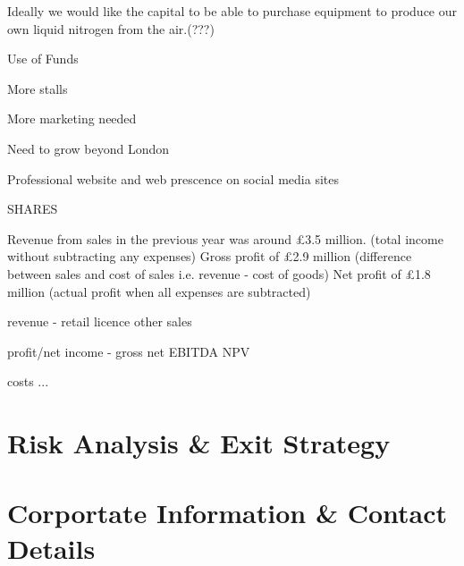 \documentclass{article}
\begin{document}
Ideally we would like the capital to be able to purchase equipment to
produce our own liquid nitrogen from the air.(???)

Use of Funds

More stalls

More marketing needed

Need to grow beyond London

Professional website and web prescence on social media sites


SHARES

Revenue from sales in the previous year was around £3.5 million. (total income without subtracting any expenses) 
Gross profit of £2.9 million (difference between sales and cost of sales i.e. revenue - cost of goods)
Net profit of £1.8 million (actual profit when all expenses are subtracted)



revenue
 - retail
   licence
   other sales

profit/net income
 - gross
   net
   EBITDA
   NPV

costs
 ...

\section{Risk Analysis \& Exit Strategy}



\section{Corportate Information \& Contact Details}
\end{document}
